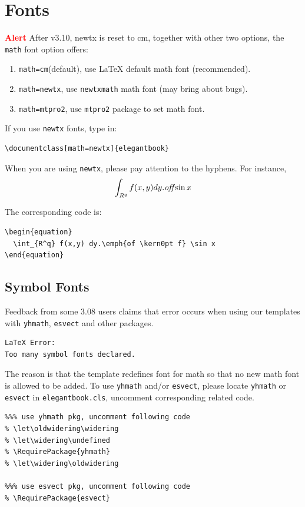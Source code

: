 \documentclass[11pt,bibend=bibtex]{elegantbook}
\begin{document}
\section{Fonts}
\textcolor{red}{\bfseries Alert} After v3.10, newtx is reset to cm, together with other two options, the \lstinline{math} font option offers:
\begin{enumerate}
  \item \lstinline{math=cm}(default), use \LaTeX{} default math font (recommended).
  \item \lstinline{math=newtx}, use \lstinline{newtxmath} math font (may bring about bugs).
  \item \lstinline{math=mtpro2}, use \lstinline{mtpro2} package to set math font.
\end{enumerate}

If you use \lstinline{newtx} fonts, type in:
\begin{lstlisting}
\documentclass[math=newtx]{elegantbook}
\end{lstlisting}

When you are using \lstinline{newtx}, please pay attention to the hyphens. For instance,
\begin{equation}
\int_{R^q} f(x,y) dy.\emph{of\kern0pt f} \sin x
\end{equation}

The corresponding code is: 
\begin{lstlisting}
\begin{equation}
  \int_{R^q} f(x,y) dy.\emph{of \kern0pt f} \sin x
\end{equation}
\end{lstlisting}

\subsection{Symbol Fonts}
Feedback from some 3.08 users claims that error occurs when using our templates with  \lstinline{yhmath}, \lstinline{esvect} and other packages.
\begin{lstlisting}
LaTeX Error:
Too many symbol fonts declared.
\end{lstlisting}

The reason is that the template redefines font for math so that no new math font is allowed to be added. To use \lstinline{yhmath} and/or \lstinline{esvect}, please locate \lstinline{yhmath} or \lstinline{esvect} in \lstinline{elegantbook.cls}, uncomment corresponding related code.

\begin{lstlisting}
%%% use yhmath pkg, uncomment following code
% \let\oldwidering\widering
% \let\widering\undefined
% \RequirePackage{yhmath}
% \let\widering\oldwidering

%%% use esvect pkg, uncomment following code
% \RequirePackage{esvect}
\end{lstlisting}
\end{document}
